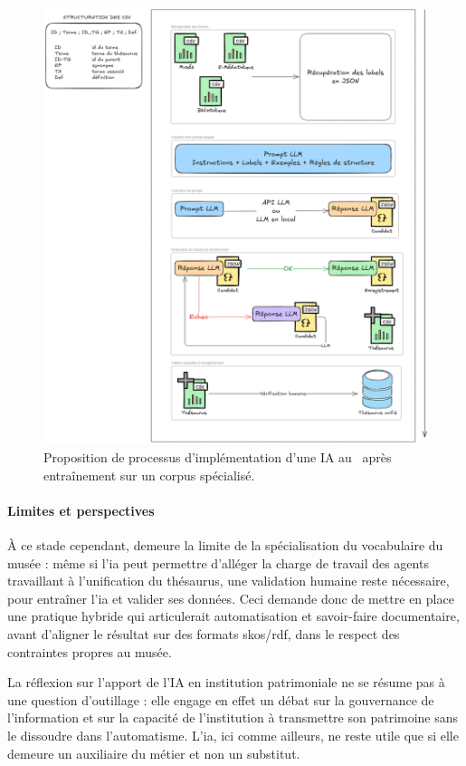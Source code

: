 \begin{figure}[htbp]
	\centering
	\includegraphics[width=0.7\linewidth]{img/SCHEM_processus_IA}
	\caption[Proposition de processus d'implémentation d'une IA au \mae]{Proposition de processus d'implémentation d'une IA au \mae~après entraînement sur un corpus spécialisé.}
	\label{fig:schemprocessusia}
\end{figure}



\paragraph*{Limites et perspectives}
À ce stade cependant, demeure la limite de la spécialisation du vocabulaire du musée : même si l'\ac{ia} peut permettre d'alléger la charge de travail des agents travaillant à l'unification du thésaurus, une validation humaine reste nécessaire, pour entraîner l'\ac{ia} et valider ses données. Ceci demande donc de mettre en place une pratique hybride qui articulerait automatisation et savoir-faire documentaire, avant d'aligner le résultat sur des formats \ac{skos}/\ac{rdf}, dans le respect des contraintes propres au musée.

La réflexion sur l’apport de l’IA en institution patrimoniale ne se résume pas à une question d’outillage : elle engage en effet un débat sur la gouvernance de l’information et sur la capacité de l’institution à transmettre son patrimoine sans le dissoudre dans l’automatisme. L'\ac{ia}, ici comme ailleurs, ne reste utile que si elle demeure un auxiliaire du métier et non un substitut. 